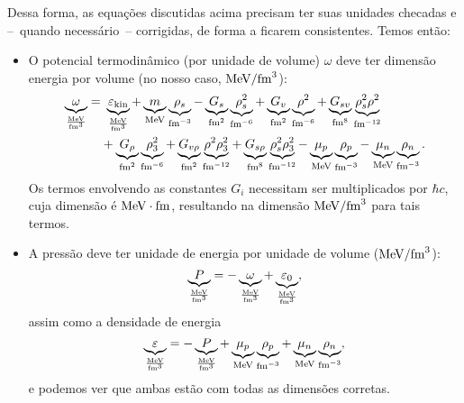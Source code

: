 Dessa forma, as equações discutidas acima precisam ter suas unidades checadas e --~quando necessário~-- corrigidas, de forma a ficarem consistentes. Temos então:
\begin{fullwidth}
\begin{itemize}

\item O potencial termodinâmico (por unidade de volume) $\omega$ deve ter dimensão energia por volume (no nosso caso, $\rm{MeV}/\rm{fm}^3$):
\begin{equation}
\begin{split}
	\underbrace{\omega}_{\frac{\rm{MeV}}{\rm{fm}^3}} =&~ \underbrace{\varepsilon_{\rm{kin}}}_{\frac{\rm{MeV}}{\rm{fm}^3}} +\underbrace{m}_{\rm{MeV}}\underbrace{\rho_s}_{\rm{fm}^{-3}} - \underbrace{G_s}_{\rm{fm}^2}\underbrace{\rho_s^2}_{\rm{fm}^{-6}} + \underbrace{G_v}_{\rm{fm}^2}\underbrace{\rho^2}_{\rm{fm}^{-6}} + \underbrace{G_{sv}}_{\rm{fm}^8}\underbrace{\rho_s^2\rho^2}_{\rm{fm}^{-12}} \\
&+ \underbrace{G_\rho}_{\rm{fm}^2}\underbrace{\rho_3^2}_{\rm{fm}^{-6}} + \underbrace{G_{v\rho}}_{\rm{fm}^2}\underbrace{\rho^2\rho_3^2}_{\rm{fm}^{-12}} + \underbrace{G_{s\rho}}_{\rm{fm}^8}\underbrace{\rho_s^2\rho_3^2}_{\rm{fm}^{-12}} - \underbrace{\mu_p}_{\rm{MeV}}\underbrace{\rho_p}_{\rm{fm}^{-3}} - \underbrace{\mu_n}_{\rm{MeV}}\underbrace{\rho_n}_{\rm{fm}^{-3}}.
\end{split}
\end{equation}
%
Os termos envolvendo as constantes $G_i$ necessitam ser multiplicados por $\hbar c$, cuja dimensão é $\rm{MeV}\cdot\rm{fm}$, resultando na dimensão $\rm{MeV}/\rm{fm}^3$ para tais termos.

\item A pressão deve ter unidade de energia por unidade de volume ($\rm{MeV}/\rm{fm}^3$):
\begin{equation}
	\underbrace{P}_{\frac{\rm{MeV}}{\rm{fm}^3}} = - \underbrace{\omega}_{\frac{\rm{MeV}}{\rm{fm}^3}} + \underbrace{\varepsilon_0}_{\frac{\rm{MeV}}{\rm{fm}^3}},
\end{equation}
%
assim como a densidade de energia
\begin{equation}
	\underbrace{\varepsilon}_{\frac{\rm{MeV}}{\rm{fm}^3}} = - \underbrace{P}_{\frac{\rm{MeV}}{\rm{fm}^3}} + \underbrace{\mu_p}_{\rm{MeV}}\underbrace{\rho_p}_{\rm{fm}^{-3}} + \underbrace{\mu_n}_{\rm{MeV}}\underbrace{\rho_n}_{\rm{fm}^{-3}},
\end{equation}
%
e podemos ver que ambas estão com todas as dimensões corretas.


\end{itemize}
\end{fullwidth}
